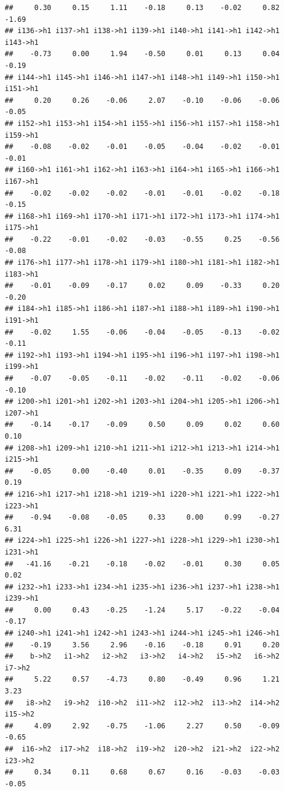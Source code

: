 \documentclass[
]{article}
\begin{document}
\begin{verbatim}
##     0.30     0.15     1.11    -0.18     0.13    -0.02     0.82    -1.69 
## i136->h1 i137->h1 i138->h1 i139->h1 i140->h1 i141->h1 i142->h1 i143->h1 
##    -0.73     0.00     1.94    -0.50     0.01     0.13     0.04    -0.19 
## i144->h1 i145->h1 i146->h1 i147->h1 i148->h1 i149->h1 i150->h1 i151->h1 
##     0.20     0.26    -0.06     2.07    -0.10    -0.06    -0.06    -0.05 
## i152->h1 i153->h1 i154->h1 i155->h1 i156->h1 i157->h1 i158->h1 i159->h1 
##    -0.08    -0.02    -0.01    -0.05    -0.04    -0.02    -0.01    -0.01 
## i160->h1 i161->h1 i162->h1 i163->h1 i164->h1 i165->h1 i166->h1 i167->h1 
##    -0.02    -0.02    -0.02    -0.01    -0.01    -0.02    -0.18    -0.15 
## i168->h1 i169->h1 i170->h1 i171->h1 i172->h1 i173->h1 i174->h1 i175->h1 
##    -0.22    -0.01    -0.02    -0.03    -0.55     0.25    -0.56    -0.08 
## i176->h1 i177->h1 i178->h1 i179->h1 i180->h1 i181->h1 i182->h1 i183->h1 
##    -0.01    -0.09    -0.17     0.02     0.09    -0.33     0.20    -0.20 
## i184->h1 i185->h1 i186->h1 i187->h1 i188->h1 i189->h1 i190->h1 i191->h1 
##    -0.02     1.55    -0.06    -0.04    -0.05    -0.13    -0.02    -0.11 
## i192->h1 i193->h1 i194->h1 i195->h1 i196->h1 i197->h1 i198->h1 i199->h1 
##    -0.07    -0.05    -0.11    -0.02    -0.11    -0.02    -0.06    -0.10 
## i200->h1 i201->h1 i202->h1 i203->h1 i204->h1 i205->h1 i206->h1 i207->h1 
##    -0.14    -0.17    -0.09     0.50     0.09     0.02     0.60     0.10 
## i208->h1 i209->h1 i210->h1 i211->h1 i212->h1 i213->h1 i214->h1 i215->h1 
##    -0.05     0.00    -0.40     0.01    -0.35     0.09    -0.37     0.19 
## i216->h1 i217->h1 i218->h1 i219->h1 i220->h1 i221->h1 i222->h1 i223->h1 
##    -0.94    -0.08    -0.05     0.33     0.00     0.99    -0.27     6.31 
## i224->h1 i225->h1 i226->h1 i227->h1 i228->h1 i229->h1 i230->h1 i231->h1 
##   -41.16    -0.21    -0.18    -0.02    -0.01     0.30     0.05     0.02 
## i232->h1 i233->h1 i234->h1 i235->h1 i236->h1 i237->h1 i238->h1 i239->h1 
##     0.00     0.43    -0.25    -1.24     5.17    -0.22    -0.04    -0.17 
## i240->h1 i241->h1 i242->h1 i243->h1 i244->h1 i245->h1 i246->h1 
##    -0.19     3.56     2.96    -0.16    -0.18     0.91     0.20 
##    b->h2   i1->h2   i2->h2   i3->h2   i4->h2   i5->h2   i6->h2   i7->h2 
##     5.22     0.57    -4.73     0.80    -0.49     0.96     1.21     3.23 
##   i8->h2   i9->h2  i10->h2  i11->h2  i12->h2  i13->h2  i14->h2  i15->h2 
##     4.09     2.92    -0.75    -1.06     2.27     0.50    -0.09    -0.65 
##  i16->h2  i17->h2  i18->h2  i19->h2  i20->h2  i21->h2  i22->h2  i23->h2 
##     0.34     0.11     0.68     0.67     0.16    -0.03    -0.03    -0.05 

\end{verbatim}
\end{document}
